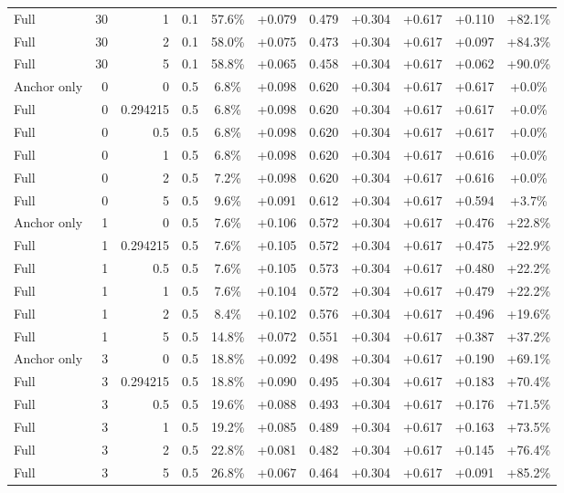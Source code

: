 \begin{table}[htbp]
\begin{tabular}{lrrrccccccc}
Full & 30 & 1 & 0.1 & 57.6\% & +0.079 & 0.479 & +0.304 & +0.617 & +0.110 & +82.1\% \\
Full & 30 & 2 & 0.1 & 58.0\% & +0.075 & 0.473 & +0.304 & +0.617 & +0.097 & +84.3\% \\
Full & 30 & 5 & 0.1 & 58.8\% & +0.065 & 0.458 & +0.304 & +0.617 & +0.062 & +90.0\% \\
Anchor only & 0 & 0 & 0.5 & 6.8\% & +0.098 & 0.620 & +0.304 & +0.617 & +0.617 & +0.0\% \\
Full & 0 & 0.294215 & 0.5 & 6.8\% & +0.098 & 0.620 & +0.304 & +0.617 & +0.617 & +0.0\% \\
Full & 0 & 0.5 & 0.5 & 6.8\% & +0.098 & 0.620 & +0.304 & +0.617 & +0.617 & +0.0\% \\
Full & 0 & 1 & 0.5 & 6.8\% & +0.098 & 0.620 & +0.304 & +0.617 & +0.616 & +0.0\% \\
Full & 0 & 2 & 0.5 & 7.2\% & +0.098 & 0.620 & +0.304 & +0.617 & +0.616 & +0.0\% \\
Full & 0 & 5 & 0.5 & 9.6\% & +0.091 & 0.612 & +0.304 & +0.617 & +0.594 & +3.7\% \\
Anchor only & 1 & 0 & 0.5 & 7.6\% & +0.106 & 0.572 & +0.304 & +0.617 & +0.476 & +22.8\% \\
Full & 1 & 0.294215 & 0.5 & 7.6\% & +0.105 & 0.572 & +0.304 & +0.617 & +0.475 & +22.9\% \\
Full & 1 & 0.5 & 0.5 & 7.6\% & +0.105 & 0.573 & +0.304 & +0.617 & +0.480 & +22.2\% \\
Full & 1 & 1 & 0.5 & 7.6\% & +0.104 & 0.572 & +0.304 & +0.617 & +0.479 & +22.2\% \\
Full & 1 & 2 & 0.5 & 8.4\% & +0.102 & 0.576 & +0.304 & +0.617 & +0.496 & +19.6\% \\
Full & 1 & 5 & 0.5 & 14.8\% & +0.072 & 0.551 & +0.304 & +0.617 & +0.387 & +37.2\% \\
Anchor only & 3 & 0 & 0.5 & 18.8\% & +0.092 & 0.498 & +0.304 & +0.617 & +0.190 & +69.1\% \\
Full & 3 & 0.294215 & 0.5 & 18.8\% & +0.090 & 0.495 & +0.304 & +0.617 & +0.183 & +70.4\% \\
Full & 3 & 0.5 & 0.5 & 19.6\% & +0.088 & 0.493 & +0.304 & +0.617 & +0.176 & +71.5\% \\
Full & 3 & 1 & 0.5 & 19.2\% & +0.085 & 0.489 & +0.304 & +0.617 & +0.163 & +73.5\% \\
Full & 3 & 2 & 0.5 & 22.8\% & +0.081 & 0.482 & +0.304 & +0.617 & +0.145 & +76.4\% \\
Full & 3 & 5 & 0.5 & 26.8\% & +0.067 & 0.464 & +0.304 & +0.617 & +0.091 & +85.2\% \\

\end{tabular}
\end{table}
